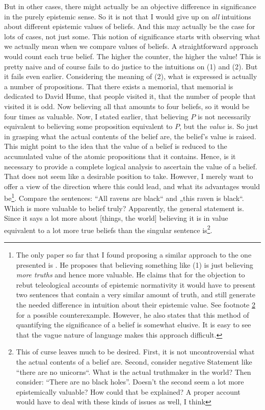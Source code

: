 \documentclass[12pt,numbers=noenddot]{scrartcl}
\begin{document}
But in other cases, there might actually be an objective difference in significance in the purely epistemic sense. So it is not that I would give up on \emph{all} intuitions about different epistemic values of beliefs. And this may actually be the case for lots of cases, not just some. This notion of significance starts with observing what we actually mean when we compare values of beliefs. A straightforward approach would count each true belief. The higher the counter, the higher the value! This is pretty naive and of course fails to do justice to the intuitions on (1) and (2). But it fails even earlier. Considering the meaning of (2), what is expressed is actually a number of propositions. That there exists a memorial, that memorial is dedicated to David Hume, that people visited it, that the number of people that visited it is odd. Now believing all that amounts to four beliefs, so it would be four times as valuable. Now, I stated earlier, that believing $P$ is not necessarily equivalent to believing some proposition equivalent to $P$, but the \emph{value} is. So just in grasping what the actual contents of the belief are, the belief's value is raised. This might point to the idea that the value of a belief is reduced to the accumulated value of the atomic propositions that it contains. Hence, is it necessary to provide a complete logical analysis to ascertain the value of a belief. That does not seem like a desirable position to take. However, I merely want to offer a view of the direction where this could lead, and what its advantages would be\footnote{The only paper so far that I found proposing a similar approach to the one presented is \textcite{Treanor2014-TRETTA}. He proposes that believing something like (1) is just believing \emph{more truths} and hence more valuable. He claims that for the objection to rebut teleological accounts of epistemic normativity it would have to present two sentences that contain a very similar amount of truth, and still generate the needed difference in intuition about their epistemic value. See footnote \ref{foot:noblackholes} for a possible counterexample. However, he also states that this method of quantifying the significance of a belief is somewhat elusive. It is easy to see that the vague nature of language makes this approach difficult.}.
Compare the sentences: “All ravens are black“ and „this raven is black“. Which is more valuable to belief truly? Apparently, the general statement is. Since it says a lot more about [things, the world] believing it  is in value equivalent to a lot more true beliefs than the singular sentence is\footnote{\label{foot:noblackholes}This of curse leaves much to be desired. First, it is not uncontroversial what the actual contents of a belief are. Second, consider negative Statement like “there are no unicorns“. What is the actual truthmaker in the world? Then consider: “There are no black holes”. Doesn't the second seem a lot more epistemically valuable? How could that be explained? A proper account would have to deal with these kinds of issues as well, I think}.
\end{document}
